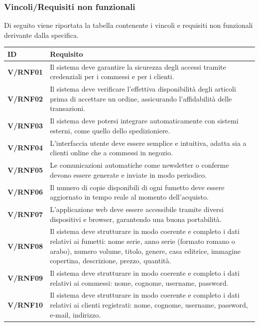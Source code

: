\documentclass[12pt, a4paper]{article}
\begin{document}
\subsubsection{Vincoli/Requisiti non funzionali}
Di seguito viene riportata la tabella contenente i vincoli e requisiti non funzionali derivante dalla specifica.
\begin{center}
\begin{tabularx}{1\textwidth}{|>{\hsize=0.13\hsize}X|>{\hsize=0.8\hsize}X|}
\hline
\textbf{ID} & \textbf{Requisito} \\
\hline
\textbf{V/RNF01} & Il sistema deve garantire la sicurezza degli accessi tramite credenziali per i commessi e per i clienti. \\
\hline
\textbf{V/RNF02} & Il sistema deve verificare l’effettiva disponibilità degli articoli prima di accettare un ordine, assicurando l’affidabilità delle transazioni. \\
\hline
\textbf{V/RNF03} & Il sistema deve potersi integrare automaticamente con sistemi esterni, come quello dello spedizioniere. \\
\hline
\textbf{V/RNF04} & L’interfaccia utente deve essere semplice e intuitiva, adatta sia a clienti online che a commessi in negozio. \\
\hline
\textbf{V/RNF05} & Le comunicazioni automatiche come newsletter o conferme devono essere generate e inviate in modo periodico. \\
\hline
\textbf{V/RNF06} & Il numero di copie disponibili di ogni fumetto deve essere aggiornato in tempo reale al momento dell’acquisto. \\
\hline
\textbf{V/RNF07} & L'applicazione web deve essere accessibile tramite diversi dispositivi e browser, garantendo una buona portabilità. \\
\hline
\textbf{V/RNF08} & Il sistema deve strutturare in modo coerente e completo i dati relativi ai fumetti: nome serie, anno serie (formato romano o arabo), numero volume, titolo, genere, casa editrice, immagine copertina, descrizione, prezzo, quantità. \\
\hline
\textbf{V/RNF09} & Il sistema deve strutturare in modo coerente e completo i dati relativi ai commessi: nome, cognome, username, password. \\
\hline
\textbf{V/RNF10} & Il sistema deve strutturare in modo coerente e completo i dati relativi ai clienti registrati: nome, cognome, username, password, e-mail, indirizzo. \\
\hline
\end{tabularx}
\end{center}
\end{document}
